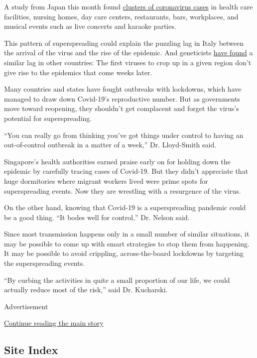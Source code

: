 A study from Japan this month found
\href{https://wwwnc.cdc.gov/eid/article/26/9/20-2272_article}{clusters
of coronavirus cases} in health care facilities, nursing homes, day care
centers, restaurants, bars, workplaces, and musical events such as live
concerts and karaoke parties.

This pattern of superspreading could explain the puzzling lag in Italy
between the arrival of the virus and the rise of the epidemic. And
geneticists
\href{https://www.nytimes3xbfgragh.onion/2020/05/27/health/coronavirus-spread-united-states.html}{have
found} a similar lag in other countries: The first viruses to crop up in
a given region don't give rise to the epidemics that come weeks later.

Many countries and states have fought outbreaks with lockdowns, which
have managed to draw down Covid-19's reproductive number. But as
governments move toward reopening, they shouldn't get complacent and
forget the virus's potential for superspreading.

``You can really go from thinking you've got things under control to
having an out-of-control outbreak in a matter of a week,'' Dr.
Lloyd-Smith said.

Singapore's health authorities earned praise early on for holding down
the epidemic by carefully tracing cases of Covid-19. But they didn't
appreciate that huge dormitories where migrant workers lived were prime
spots for superspreading events. Now they are wrestling with a
resurgence of the virus.

On the other hand, knowing that Covid-19 is a superspreading pandemic
could be a good thing. ``It bodes well for control,'' Dr. Nelson said.

Since most transmission happens only in a small number of similar
situations, it may be possible to come up with smart strategies to stop
them from happening. It may be possible to avoid crippling,
across-the-board lockdowns by targeting the superspreading events.

``By curbing the activities in quite a small proportion of our life, we
could actually reduce most of the risk,'' said Dr. Kucharski.

Advertisement

\protect\hyperlink{after-bottom}{Continue reading the main story}

\hypertarget{site-index}{%
\subsection{Site Index}\label{site-index}}

